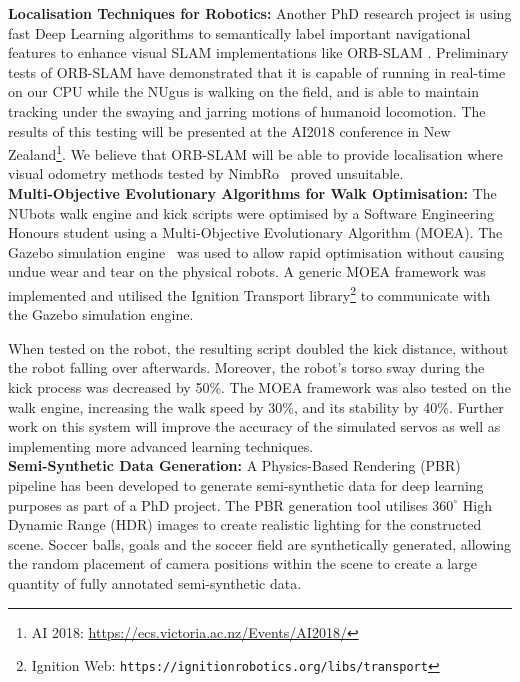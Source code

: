 \documentclass{llncs}
\begin{document}
\noindent\textbf{Localisation Techniques for Robotics:}
Another PhD research project is using fast Deep Learning algorithms to semantically label important navigational features to enhance visual SLAM implementations like ORB-SLAM \cite{mur2015orb}. Preliminary tests of ORB-SLAM have demonstrated that it is capable of running in real-time on our CPU while the NUgus is walking on the field, and is able to maintain tracking under the swaying and jarring motions of humanoid locomotion. The results of this testing will be presented at the AI2018 conference in New Zealand\footnote{AI 2018: \url{https://ecs.victoria.ac.nz/Events/AI2018/}}. We believe that ORB-SLAM will be able to provide localisation where visual odometry methods tested by NimbRo~\cite{Nimbro2018TDP} proved unsuitable.\\

\noindent\textbf{Multi-Objective Evolutionary Algorithms for Walk Optimisation:}
The NUbots walk engine and kick scripts were optimised by a Software Engineering Honours student using a Multi-Objective Evolutionary Algorithm (MOEA). The Gazebo simulation engine~\cite{koenig2004design} was used to allow rapid optimisation without causing undue wear and tear on the physical robots. A generic MOEA framework was implemented and utilised the Ignition Transport library\footnote{Ignition Web: \texttt{https://ignitionrobotics.org/libs/transport}} to communicate with the Gazebo simulation engine.

When tested on the robot, the resulting script doubled the kick distance, without the robot falling over afterwards. Moreover, the robot's torso sway during the kick process was decreased by 50\%. The MOEA framework was also tested on the walk engine, increasing the walk speed by 30\%, and its stability by 40\%. Further work on this system will improve the accuracy of the simulated servos as well as implementing more advanced learning techniques.\\

\noindent\textbf{Semi-Synthetic Data Generation:}
A Physics-Based Rendering (PBR) pipeline has been developed to generate semi-synthetic data for deep learning purposes as part of a PhD project. The PBR generation tool utilises $360^{\circ}$ High Dynamic Range (HDR) images to create realistic lighting for the constructed scene. Soccer balls, goals and the soccer field are synthetically generated, allowing the random placement of camera positions within the scene to create a large quantity of fully annotated semi-synthetic data.
\end{document}
